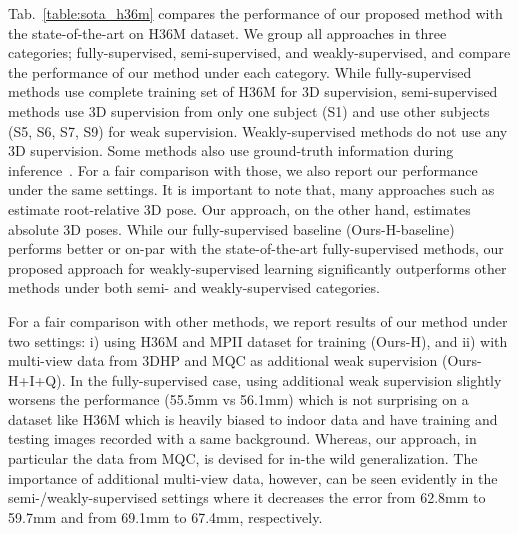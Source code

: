 Tab.~\ref{table:sota_h36m} compares the performance of our proposed method with the state-of-the-art on H36M dataset. We group all approaches in three categories; fully-supervised, semi-supervised, and weakly-supervised, and compare the performance of our method under each category.  While fully-supervised methods use complete training set of H36M for 3D supervision, semi-supervised methods use 3D supervision from only one subject (S1) and use other subjects (S5,  S6, S7,  S9) for weak supervision. Weakly-supervised methods do not use any 3D supervision. Some methods also use ground-truth information during inference~\cite{sun2017compositional,sun18integeral,kocabas2019epipolar}. For a fair comparison with those, we also report our performance under the same settings. It is important to note that, many approaches such as~\cite{rohdin2018geometry,rohdin2018multiview,martinez2017simple,rogez2017lcr, yang20183d,chen2019unsupervised,drove2018can3d} estimate root-relative 3D pose. Our approach, on the other hand, estimates absolute 3D poses. While our fully-supervised baseline (Ours-H-baseline) performs better or on-par with the state-of-the-art fully-supervised methods, our proposed approach for weakly-supervised learning   significantly outperforms other methods under both semi- and weakly-supervised categories. 

For a fair comparison with other methods, we report results of our method under two settings: i) using H36M and MPII dataset for training (Ours-H), and ii) with multi-view data from 3DHP and MQC as additional weak supervision (Ours-H+I+Q). In the fully-supervised case, using additional weak supervision slightly worsens the performance (55.5mm vs 56.1mm) which is not surprising on a dataset like H36M which is heavily biased to indoor data and have training and testing images recorded with a same background. Whereas, our approach, in particular the data from MQC, is devised for in-the wild generalization. The importance of additional multi-view data, however, can be seen evidently in the semi-/weakly-supervised settings where it decreases the error from 62.8mm to 59.7mm and from 69.1mm to 67.4mm, respectively. 


